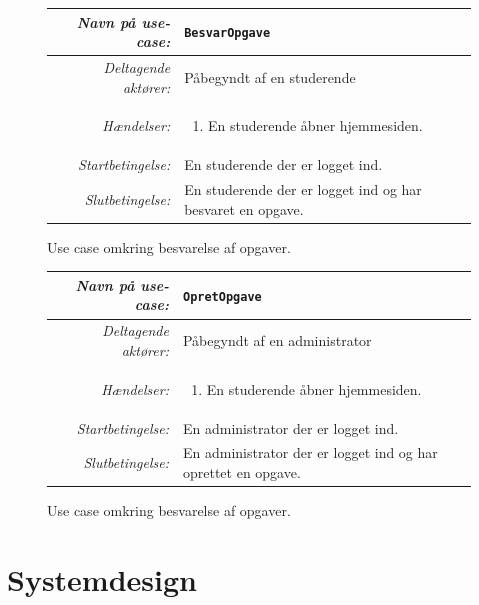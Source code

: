 \documentclass[12pt]{article}
\begin{document}
\begin{figure}[htpb]
    \centering
    \begin{tabular}{r p{10cm}}
        \toprule
        \textit{Navn på use-case:} & \verb!BesvarOpgave! \\
        \hline
        \textit{Deltagende aktører:} & Påbegyndt af en studerende \\
        \hline
        \textit{Hændelser:} & \begin{enumerate}[nolistsep]
            \item En studerende åbner hjemmesiden.
        \end{enumerate}  \\
        \hline
        \textit{Startbetingelse:} & En studerende der er logget ind. \\
        \hline
        \textit{Slutbetingelse:} & En studerende der er logget ind og har besvaret en opgave. \\
        \bottomrule
    \end{tabular}
    \caption{Use case omkring besvarelse af opgaver.}
    \label{fig:use_case1}
\end{figure}

\begin{figure}[htpb]
    \centering
    \begin{tabular}{r p{10cm}}
        \toprule
        \textit{Navn på use-case:} & \verb!OpretOpgave! \\
        \hline
        \textit{Deltagende aktører:} & Påbegyndt af en administrator \\
        \hline
        \textit{Hændelser:} & \begin{enumerate}[nolistsep]
            \item En studerende åbner hjemmesiden.
        \end{enumerate}  \\
        \hline
        \textit{Startbetingelse:} & En administrator der er logget ind. \\
        \hline
        \textit{Slutbetingelse:} & En administrator der er logget ind og har oprettet en opgave. \\
        \bottomrule
    \end{tabular}
    \caption{Use case omkring besvarelse af opgaver.}
    \label{fig:use_case1}
\end{figure}

\section{Systemdesign}
\label{sec:systemdesign}
\end{document}
